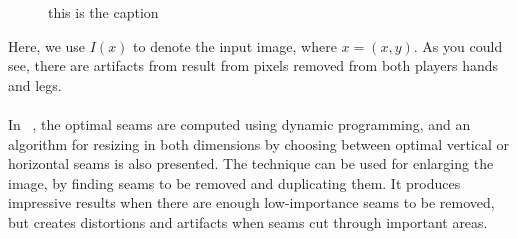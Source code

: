 \documentclass[conference]{acmsiggraph}
\begin{document}
\begin{figure}[ht]       
    \caption{this is the caption}
    \label{materialflowChart}
\end{figure}


Here, we use $I(x)$ to denote the input image, where $x = (x, y)$. As you could see, there are artifacts from result from pixels removed from both players hands and legs.

\paragraph{}
In  ~\cite{Avidan2007}, the optimal seams are computed using dynamic programming, and an algorithm for resizing in both dimensions by choosing between optimal vertical or horizontal seams is also presented. The technique can be used for enlarging the image, by finding seams to be removed and duplicating them. It produces impressive results when there are enough low-importance seams to be removed, but creates distortions and artifacts when seams cut through important areas.
\end{document}
